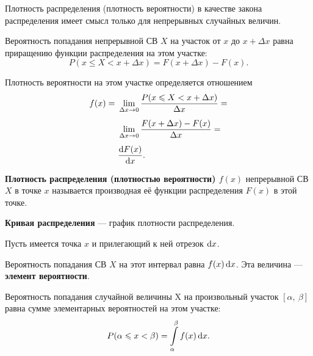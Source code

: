 \documentclass[a4paper]{article}
\newcommand{\sleq}{\leqslant}
\newcommand{\key}[1]{{\color{Medium}\bfseries #1}}
\begin{document}
                Плотность распределения (плотность вероятности) в качестве закона распределения имеет смысл только для непрерывных случайных величин.
                
                Вероятность попадания непрерывной СВ $X$ на участок $\text{от } x \text{ до } x + \Delta x$ равна приращению функции распределения на этом участке:
                \begin{equation*}
                    P(x \sleq X < x + \Delta x) = F(x + \Delta x) - F(x) .
                \end{equation*}
                
                Плотность вероятности на этом участке определяется отношением
                \begin{equation*}
                    \begin{aligned}
                        f(x) = ~& \lim\limits_{\Delta x \to 0}
                            \frac{P(x \sleq X < x + \Delta x)}{\Delta x} = \\[1.0ex]
                        & \lim\limits_{\Delta x \to 0}
                            \frac{F(x + \Delta x) - F(x)}{\Delta x} = \\[1.0ex]
                        & \frac{\dif F(x)}{\dif x} .
                    \end{aligned}
                \end{equation*}

                \key{Плотность распределения (плотностью вероятности) \boldmath$f(x)$} непрерывной СВ $X$ в точке $x$ называется производная её функции распределения $F(x)$ в этой точке.
                
                \key{Кривая распределения} --- график плотности распределения.

                Пусть имеется точка $x$ и прилегающий к ней отрезок $\dif x $.
                
                Вероятность попадания СВ $X$ на этот интервал равна $f(x) \dif x$. Эта величина --- \key{элемент вероятности}.
                
                Вероятность попадания случайной величины X на произвольный участок $[\alpha , \: \beta]$ равна сумме элементарных вероятностей на этом участке:
                \begin{equation*}
                    P(\alpha \sleq x < \beta) = \int\limits_{\alpha}^{\beta} f(x) \dif x .
                \end{equation*}
\end{document}
